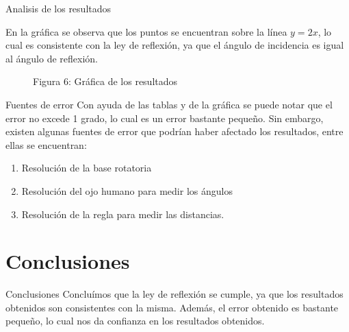\documentclass{beamer}
\begin{document}
\begin{frame}{Analisis de los resultados}
\begin{minipage}{.45\textwidth}
    En la gráfica se observa que los puntos se encuentran sobre la línea $y=2x$, lo cual es consistente con la ley de reflexión, ya que el ángulo de incidencia es igual al ángulo de reflexión.
\end{minipage}
\hfill
\begin{minipage} {0.45\textwidth}
    \centering
    \begin{figure}
        \caption*{Figura 6: Gráfica de los resultados}
    \end{figure}
\end{minipage}
\end{frame}

\begin{frame}{Fuentes de error}
    Con ayuda de las tablas y de la gráfica se puede notar que el error no excede 1 grado, lo cual es un error bastante pequeño. Sin embargo, existen algunas fuentes de error que podrían haber afectado los resultados, entre ellas se encuentran: \\
    \begin{enumerate}
        \item Resolución de la base rotatoria
        \item Resolución del ojo humano para medir los ángulos
        \item Resolución de la regla para medir las distancias.
    \end{enumerate}
\end{frame}


\section{Conclusiones}
\begin{frame}{Conclusiones}
    Concluímos que la ley de reflexión se cumple, ya que los resultados obtenidos son consistentes con la misma. Además, el error obtenido es bastante pequeño, lo cual nos da confianza en los resultados obtenidos.
\end{frame}
\end{document}

